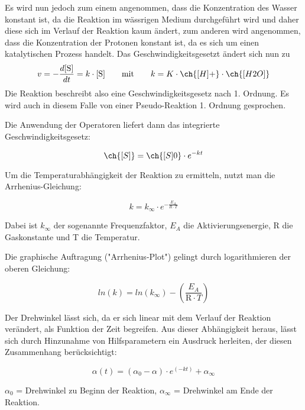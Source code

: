 Es wird nun jedoch zum einem angenommen, dass die Konzentration des Wasser konstant ist, da die Reaktion im wässrigen Medium durchgeführt wird und daher diese sich im Verlauf der Reaktion kaum ändert, zum anderen wird angenommen, dass die Konzentration der Protonen konstant ist, da es sich um einen katalytischen Prozess handelt. Das Geschwindigkeitsgesetzt ändert sich nun zu
\begin{equation}
v = - \frac{d \text{[S]}}{dt}= k \cdot \text{[S]}
\quad\quad \text{mit}\quad\quad  k=K\cdot\ch{\text{[}H\text{]}+} \cdot \ch{[H2O]}
\label{Pseudo1.Ordnung}
\end{equation}
Die Reaktion beschreibt also eine Geschwindigkeitsgesetz nach  1. Ordnung. Es wird auch in diesem Falle von einer Pseudo-Reaktion 1. Ordnung gesprochen. 



Die Anwendung der Operatoren liefert dann das integrierte Geschwindigkeitsgesetz:

\begin{equation}
\ch{[S]} = \ch{[S]0}\cdot e^{-kt}
\label{eq:integriertesGesetz}
\end{equation}

Um die Temperaturabhängigkeit der Reaktion zu ermitteln, nutzt man die Arrhenius-Gleichung:

\begin{equation}
k=k_\infty \cdot e^{ - \frac{E_A}{R \cdot T}}
\label{eq:Arrheniusgleichung}
\end{equation}

Dabei ist $k_\infty$ der sogenannte Frequenzfaktor, $E_A$ die Aktivierungsenergie, R die Gaskonstante und T die Temperatur.

Die graphische Auftragung ("Arrhenius-Plot") gelingt durch logarithmieren der oberen Gleichung:

\begin{equation}
ln(k)=ln(k_\infty)-\left( \frac{E_A}{ \text{R} \cdot T} \right)
\label{eq:logarithmArrhenius}
\end{equation}

Der Drehwinkel lässt sich, da er sich linear mit dem Verlauf der Reaktion verändert, als Funktion der Zeit begreifen. Aus dieser Abhängigkeit heraus, lässt sich durch Hinzunahme von Hilfsparametern ein Ausdruck herleiten, der diesen Zusammenhang berücksichtigt:

\begin{equation}
\alpha(t)=(\alpha_0-\alpha)\cdot e^{(-kt)}+\alpha_\infty
\label{eq:winkelvontfunktion}
\end{equation}

$\alpha_0$ = Drehwinkel zu Beginn der Reaktion, $\alpha_\infty$ = Drehwinkel am Ende der Reaktion.



